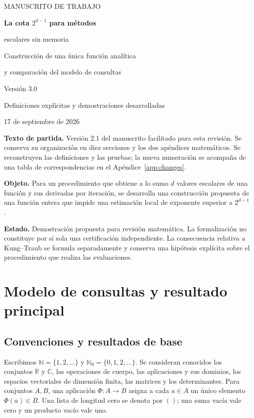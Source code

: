 \documentclass[11pt,a4paper]{article}
\numberwithin{equation}{section}
\theoremstyle{definition}
\theoremstyle{remark}
\newcommand{\R}{\mathbb R}
\newcommand{\C}{\mathbb C}
\newcommand{\N}{\mathbb N}
\newcommand{\Nn}{\mathbb N_0}
\begin{document}
\begin{titlepage}
\centering
\vspace*{15mm}
{\large MANUSCRITO DE TRABAJO\par}
\vspace{13mm}
{\LARGE\bfseries La cota $2^{d-1}$ para métodos\par escalares sin memoria\par}
\vspace{9mm}
{\Large Construcción de una única función analítica\par y comparación del modelo de consultas\par}
\vspace{10mm}
{\large Versión 3.0\par}
{\large Definiciones explícitas y demostraciones desarrolladas\par}
\vspace{6mm}
{17 de septiembre de 2026\par}
\vfill
\begin{minipage}{0.9\textwidth}
\textbf{Texto de partida.} Versión 2.1 del manuscrito facilitado para esta revisión. Se conserva su organización en diez secciones y los dos apéndices matemáticos. Se reconstruyen las definiciones y las pruebas; la nueva numeración se acompaña de una tabla de correspondencias en el Apéndice~\ref{app:changes}.

\textbf{Objeto.} Para un procedimiento que obtiene a lo sumo $d$ valores escalares de una función y sus derivadas por iteración, se desarrolla una construcción propuesta de una función entera que impide una estimación local de exponente superior a $2^{d-1}$.

\textbf{Estado.} Demostración propuesta para revisión matemática. La formalización no constituye por sí sola una certificación independiente. La consecuencia relativa a Kung--Traub se formula separadamente y conserva una hipótesis explícita sobre el procedimiento que realiza las evaluaciones.
\end{minipage}
\vspace*{10mm}
\end{titlepage}
\tableofcontents
\clearpage
{}

\section{Modelo de consultas y resultado principal}\label{sec:model}

\subsection{Convenciones y resultados de base}
Escribimos $\N=\{1,2,\ldots\}$ y $\Nn=\{0,1,2,\ldots\}$. Se consideran conocidos los conjuntos $\R$ y $\C$, las operaciones de cuerpo, las aplicaciones y sus dominios, los espacios vectoriales de dimensión finita, las matrices y los determinantes. Para conjuntos $A,B$, una aplicación $\Phi:A\to B$ asigna a cada $a\in A$ un único elemento $\Phi(a)\in B$. Una lista de longitud cero se denota por $()$; una suma vacía vale cero y un producto vacío vale uno.
\end{document}
